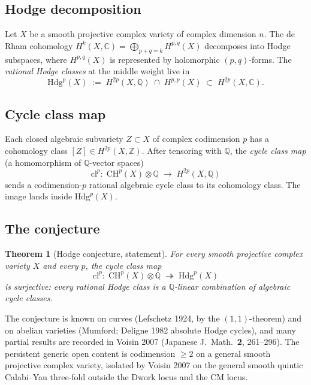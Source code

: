\documentclass[11pt,a4paper]{article}
\theoremstyle{plain}
\newtheorem{theorem}{Theorem}[section]
\theoremstyle{definition}
\begin{document}
\subsection{Hodge decomposition}

Let $X$ be a smooth projective complex variety of complex dimension
$n$. The de Rham cohomology
$H^{k}(X, \mathbb{C}) = \bigoplus_{p + q = k} H^{p, q}(X)$
decomposes into Hodge subspaces, where $H^{p,q}(X)$ is represented by
holomorphic $(p, q)$-forms. The \emph{rational Hodge classes} at the
middle weight live in
\[
\mathrm{Hdg}^{p}(X)
\;:=\; H^{2p}(X, \mathbb{Q}) \;\cap\; H^{p, p}(X)
\;\subset\; H^{2p}(X, \mathbb{C}).
\]

\subsection{Cycle class map}

Each closed algebraic subvariety $Z \subset X$ of complex codimension
$p$ has a cohomology class $[Z] \in H^{2p}(X, \mathbb{Z})$. After
tensoring with $\mathbb{Q}$, the \emph{cycle class map} (a homomorphism
of $\mathbb{Q}$-vector spaces)
\[
\mathrm{cl}^{p}:\; \mathrm{CH}^{p}(X) \otimes \mathbb{Q}
\;\longrightarrow\; H^{2p}(X, \mathbb{Q})
\]
sends a codimension-$p$ rational algebraic cycle class to its
cohomology class. The image lands inside $\mathrm{Hdg}^{p}(X)$.

\subsection{The conjecture}

\begin{theorem}[Hodge conjecture, statement]
\label{thm:hodge-statement}
For every smooth projective complex variety $X$ and every $p$, the
cycle class map
\[
\mathrm{cl}^{p}:\; \mathrm{CH}^{p}(X) \otimes \mathbb{Q}
\;\twoheadrightarrow\; \mathrm{Hdg}^{p}(X)
\]
is surjective: every rational Hodge class is a $\mathbb{Q}$-linear
combination of algebraic cycle classes.
\end{theorem}

The conjecture is known on curves (Lefschetz 1924, by the
$(1, 1)$-theorem) and on abelian varieties (Mumford; Deligne 1982
absolute Hodge cycles), and many partial results are recorded in
Voisin 2007 (Japanese J.\ Math.\ \textbf{2}, 261--296). The persistent
generic open content is codimension $\ge 2$ on a general smooth
projective complex variety, isolated by Voisin 2007 on the general
smooth quintic Calabi--Yau three-fold outside the Dwork locus and the
CM locus.
\end{document}
